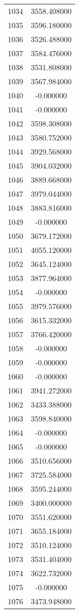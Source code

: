 \documentclass[12pt]{article}
\begin{document}
\begin{longtable}{@{}cc@{}}
1034 & 3558.408000 \\
1035 & 3596.180000 \\
1036 & 3526.488000 \\
1037 & 3584.476000 \\
1038 & 3531.808000 \\
1039 & 3567.984000 \\
1040 & -0.000000 \\
1041 & -0.000000 \\
1042 & 3598.308000 \\
1043 & 3580.752000 \\
1044 & 3929.568000 \\
1045 & 3904.032000 \\
1046 & 3889.668000 \\
1047 & 3979.044000 \\
1048 & 3883.816000 \\
1049 & -0.000000 \\
1050 & 3679.172000 \\
1051 & 4055.120000 \\
1052 & 3645.124000 \\
1053 & 3877.964000 \\
1054 & -0.000000 \\
1055 & 3979.576000 \\
1056 & 3615.332000 \\
1057 & 3766.420000 \\
1058 & -0.000000 \\
1059 & -0.000000 \\
1060 & -0.000000 \\
1061 & 3941.272000 \\
1062 & 3433.388000 \\
1063 & 3598.840000 \\
1064 & -0.000000 \\
1065 & -0.000000 \\
1066 & 3510.656000 \\
1067 & 3725.584000 \\
1068 & 3595.244000 \\
1069 & 3400.000000 \\
1070 & 3551.620000 \\
1071 & 3655.184000 \\
1072 & 3510.124000 \\
1073 & 3531.404000 \\
1074 & 3622.732000 \\
1075 & -0.000000 \\
1076 & 3473.948000 \\

\end{longtable}
\end{document}
